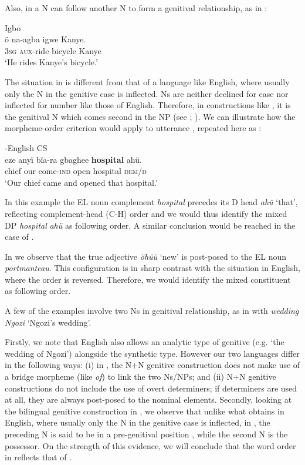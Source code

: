 \documentclass[output=paper]{langsci/langscibook}
\begin{document}
Also, in  a N can follow another N to form a genitival relationship, as in : 

\ea\label{ex:ihemere:10}
{Igbo}\\
\gll ö    na-agba   igwe    Kanye.\\
     \textsc{3sg}    \textsc{aux}-ride  bicycle    Kanye\\
\glt ‘He rides Kanye’s bicycle.’
\z

The situation in  is different from that of a language like English, where usually only the N in the genitive case is inflected.  Ns are neither declined for case nor inflected for number like those of English. Therefore, in constructions like , it is the genitival N which comes second in the  NP (see \citealt{Emenanjo1978}; \citealt{Uwalaka1997}). We can illustrate how the morpheme-order criterion would apply to utterance , repeated here as :

\ea\label{ex:ihemere:11}
{-English CS}\\
\gll eze    anyï  bïa-ra        gbaghee  \textbf{hospital}  ahü.  \\
     chief   our  come-\textsc{ind}  open        hospital    \textsc{dem/d}\\
\glt ‘Our chief came and opened that hospital.’
\z

In this example the EL noun complement \textit{hospital} precedes its  D head \textit{ahü} ‘that’, reflecting  complement-head (C-H) order and we would thus identify the mixed DP \textit{hospital}\textbf{\textit{}} \textit{ahü} as following  order. A similar conclusion would be reached in the case of .

In  we observe that the  true adjective \textit{öhüü} ‘new’ is post-posed to the EL noun \textit{portmanteau}. This configuration is in sharp contrast with the situation in English, where the order is reversed. Therefore, we would identify the mixed constituent as following  order. 

A few of the examples involve two Ns in genitival relationship, as in  with \textit{wedding Ngozi} ‘Ngozi’s wedding’. 

Firstly, we note that English also allows an analytic type of genitive (e.g. ‘the wedding of Ngozi’) alongside the synthetic type. However our two languages differ in the following ways: (i) in , the N+N genitive construction does not make use of a bridge morpheme (like \textit{of}) to link the two Ns/NPs; and (ii)  N+N genitive constructions do not include the use of overt determiners; if determiners are used at all, they are always post-posed to the nominal elements. Secondly, looking at the bilingual genitive construction in , we observe that unlike what obtains in English, where usually only the N in the genitive case is inflected, in , the preceding N is said to be in a pre-genitival position \citep{Uwalaka1997}, while the second N is the possessor. On the strength of this evidence, we will conclude that the word order in  reflects that of . 
\end{document}

